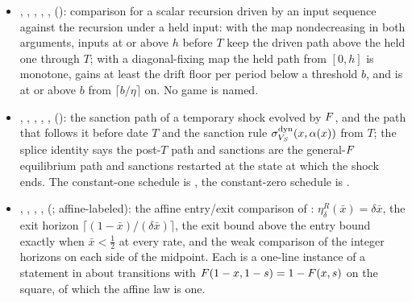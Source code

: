 \begin{itemize}[leftmargin=1.4em,itemsep=1pt]
\item {}, , , , ,  (): comparison for a scalar recursion driven by an input sequence against the recursion under a held input: with the map nondecreasing in both arguments, inputs at or above $h$ before $T$ keep the driven path above the held one through $T$; with a diagonal-fixing map the held path from $[0,h]$ is monotone, gains at least the drift floor per period below a threshold $b$, and is at or above $b$ from $\lceil b/\eta\rceil$ on. No game is named.
\item {}, , , , ,  (): the sanction path of a temporary shock evolved by $F$, and the path that follows it before date $T$ and the sanction rule $\sigma^{\mathrm{dyn}}_{V_S}(x,\alpha(x))$ from $T$; the splice identity says the post-$T$ path and sanctions are the general-$F$ equilibrium path and sanctions restarted at the state at which the shock ends. The constant-one schedule is , the constant-zero schedule is .
\item {}, , , ,  (; affine-labeled): the affine entry/exit comparison of : $\eta^{R}_\delta(\bar x)=\delta\bar x$, the exit horizon $\lceil(1-\bar x)/(\delta\bar x)\rceil$, the exit bound above the entry bound exactly when $\bar x<\tfrac12$ at every rate, and the weak comparison of the integer horizons on each side of the midpoint. Each is a one-line instance of a statement in  about transitions with $F(1-x,1-s)=1-F(x,s)$ on the square, of which the affine law is one.

\end{itemize}
